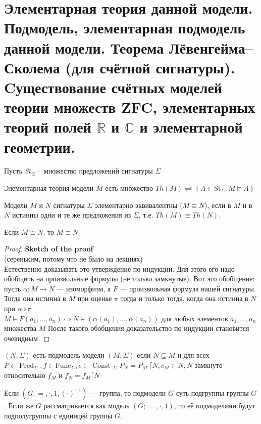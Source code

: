 \section{Элементарная теория данной модели. Подмодель, элементарная подмодель данной модели. Теорема Лёвенгейма–Сколема (для счётной сигнатуры). Cуществование счётных моделей теории множеств ZFC, элементарных теорий полей $\mathbb{R}$ и $\mathbb{C}$ и элементарной геометрии.}
Пусть $St_\varSigma$ -- множество предложений сигнатуры $\varSigma$
\begin{definition}
Элементарная теория модели $M$ есть множество $T h(M) \rightleftharpoons \left\{A \in \mathrm{St}_{\Sigma}: M \vDash A\right\}$
\end{definition}
\begin{definition}
    Модели $M$ и $N$ сигнатуры $\varSigma$ элементарно эквивалентны ($M\equiv N$), если в $M$ и в $N$ истинны одни и те же предложения из $\varSigma$, т.е. $Th(M) \equiv Th(N)$.
\end{definition}
\begin{proposition}
    Если $M \cong N$, то $M \equiv N$
\end{proposition}
\begin{proof} \textcolor{mygray}{
\textbf{Sketch of the proof} \\(сереньким, потому что не было на лекциях)\\
Естественно доказывать это утверждение по индукции. Для
этого его надо обобщить на произвольные формулы (не только замкнутые). Вот это обобщение: пусть $\alpha: M \rightarrow N$ — изоморфизм, а $F$ — произвольная формула нашей сигнатуры. Тогда она истинна в $M$ при оценке $\pi$ тогда и только тогда, когда она истинна в $N$ при $\alpha \circ \pi$\\
$M  \models F\left(a_{1}, \ldots, a_{n}\right) \Leftrightarrow N  \models\left(\alpha\left(a_{1}\right), \ldots, \alpha\left(a_{n}\right)\right)$ для любых элементов $a_{1}, \dots, a_{n}$ множества $M$
После такого обобщения доказательство по индукции становится
очевидным
}
\end{proof}
\begin{definition}
    $(N ; \Sigma)$  есть подмодель модели $(M ; \Sigma)$ если $N \subseteq M$ и для всех $P \in \operatorname{Pred}_{\Sigma}, f \in \mathrm{Func}_{\Sigma}, c \in \text { Const }_{\Sigma}$ $P_{N}=P_{M}\: \lceil N, c_{M} \in N, N$ замкнуто относительно $f_{M}$ и $f_{N}=f_{M}\lceil N$
\end{definition}
\begin{example}
Если $\left(G ;=, \cdot, 1,(\cdot)^{-1}\right)$ — группа, то  подмодели $G$ суть подгруппы группы $G$. Если же $G$  рассматривается как модель $(G ;=, \cdot, 1)$, то её подмоделями будут подполугруппы с единицей группы $G$.
\end{example}
